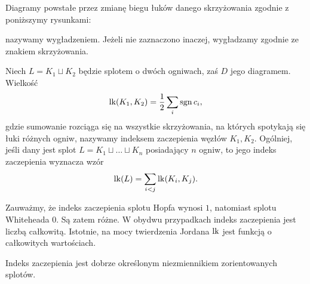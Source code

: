 \begin{definition}[wygładzenie]
%
    Diagramy powstałe przez zmianę biegu łuków danego skrzyżowania zgodnie z poniższymy rysunkami:
\begin{comment}
    {\setlength{\intextsep}{4pt plus 2pt minus 2pt}
    \begin{figure}[H]
        \setlength{\intextsep}{4pt plus 2pt minus 2pt}
        \begin{minipage}[b]{.48\linewidth}
            \[
                \MedLarAlphaSmoothing
            \]
            \subcaption{wygładzenie dodatnie}
        \end{minipage}
        \begin{minipage}[b]{.48\linewidth}
            \[
                \MedLarBetaSmoothing
            \]
            \subcaption{wygładzenie ujemne}
        \end{minipage}
    \end{figure}
    }
\end{comment}
\noindent
    nazywamy wygładzeniem.
    Jeżeli nie zaznaczono inaczej, wygładzamy zgodnie ze znakiem skrzyżowania.
\end{definition}

\begin{definition}
    Niech $L = K_1 \sqcup K_2$ będzie splotem o dwóch ogniwach, zaś $D$ jego diagramem.
    Wielkość
    \begin{equation}
        \operatorname{lk}(K_1, K_2) = \frac 12 \sum_i \operatorname{sgn} c_i,
    \end{equation}
    gdzie sumowanie rozciąga się na wszystkie skrzyżowania, na których spotykają się łuki różnych ogniw, nazywamy indeksem zaczepienia węzłów $K_1, K_2$.
    Ogólniej, jeśli dany jest splot $L = K_1 \sqcup \ldots \sqcup K_n$ posiadający $n$ ogniw, to jego indeks zaczepienia wyznacza wzór
    \begin{equation}
        \operatorname{lk}(L) = \sum_{i < j} \operatorname{lk}(K_i, K_j).
    \end{equation}
\end{definition}

Zauważmy, że indeks zaczepienia splotu Hopfa wynosi $1$, natomiast splotu Whiteheada $0$.
%
%
Są zatem różne.
W obydwu przypadkach indeks zaczepienia jest liczbą całkowitą.
Istotnie, na mocy twierdzenia Jordana $\operatorname{lk}$ jest funkcją o całkowitych wartościach.

\begin{proposition}
    Indeks zaczepienia jest dobrze określonym niezmiennikiem zorientowanych splotów.
\end{proposition}

